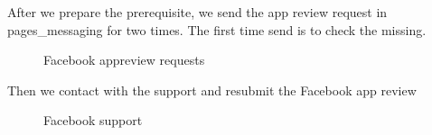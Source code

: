 \documentclass[12pt,oneside,openright,a4paper]{cpe-english-project}
\begin{document}
		\begin{flushleft}
			After we prepare the prerequisite, we send the app review request in pages\_messaging for two times. The first time send is to check the missing. 
		\end{flushleft}
		\begin{figure}[!h]\centering
			\caption{Facebook appreview requests}\label{fig:Facebook appreview requests}
		\end{figure}
\pagebreak
		\begin{flushleft}
			Then we contact with the support and resubmit the Facebook app review
		\end{flushleft}
		\begin{figure}[!h]\centering
			\caption{Facebook support}\label{fig:Facebook support}
		\end{figure}
\end{document}
